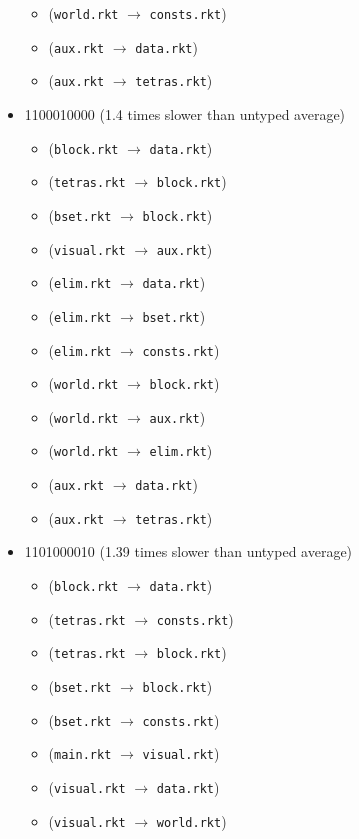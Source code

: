 \documentclass{article}
\newcommand{\mono}[1]{\texttt{#1}}
\begin{document}
\begin{itemize}
\begin{itemize}
  \item (\mono{world.rkt} $\rightarrow$ \mono{consts.rkt})
  \item (\mono{aux.rkt} $\rightarrow$ \mono{data.rkt})
  \item (\mono{aux.rkt} $\rightarrow$ \mono{tetras.rkt})
  \end{itemize}
\item 1100010000 (1.4 times slower than untyped average)
  \begin{itemize}
  \item (\mono{block.rkt} $\rightarrow$ \mono{data.rkt})
  \item (\mono{tetras.rkt} $\rightarrow$ \mono{block.rkt})
  \item (\mono{bset.rkt} $\rightarrow$ \mono{block.rkt})
  \item (\mono{visual.rkt} $\rightarrow$ \mono{aux.rkt})
  \item (\mono{elim.rkt} $\rightarrow$ \mono{data.rkt})
  \item (\mono{elim.rkt} $\rightarrow$ \mono{bset.rkt})
  \item (\mono{elim.rkt} $\rightarrow$ \mono{consts.rkt})
  \item (\mono{world.rkt} $\rightarrow$ \mono{block.rkt})
  \item (\mono{world.rkt} $\rightarrow$ \mono{aux.rkt})
  \item (\mono{world.rkt} $\rightarrow$ \mono{elim.rkt})
  \item (\mono{aux.rkt} $\rightarrow$ \mono{data.rkt})
  \item (\mono{aux.rkt} $\rightarrow$ \mono{tetras.rkt})
  \end{itemize}
\item 1101000010 (1.39 times slower than untyped average)
  \begin{itemize}
  \item (\mono{block.rkt} $\rightarrow$ \mono{data.rkt})
  \item (\mono{tetras.rkt} $\rightarrow$ \mono{consts.rkt})
  \item (\mono{tetras.rkt} $\rightarrow$ \mono{block.rkt})
  \item (\mono{bset.rkt} $\rightarrow$ \mono{block.rkt})
  \item (\mono{bset.rkt} $\rightarrow$ \mono{consts.rkt})
  \item (\mono{main.rkt} $\rightarrow$ \mono{visual.rkt})
  \item (\mono{visual.rkt} $\rightarrow$ \mono{data.rkt})
  \item (\mono{visual.rkt} $\rightarrow$ \mono{world.rkt})

\end{itemize}
\end{itemize}
\end{document}
